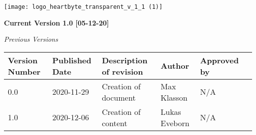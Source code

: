 \maketitle
\setlength{\parskip}{0em}

\begin{center}

      \vfill
\texttt{[image: logo\_heartbyte\_transparent\_v\_1\_1 (1)]}

    \vfill
\clearpage


    \textbf{\large Current Version 1.0 [05-12-20]}
    \vspace{10mm}
    
    \emph{\large Previous Versions}
    
\begin{center}
\begin{tabular}{ | m{5em} | m{5em}| m{10em} |m{5em}| m{5em} |m{5em} |  } 
\hline
Version Number& Published Date & Description of revision & Author & Approved by \\ 
\hline
0.0 & 2020-11-29 & Creation of document & Max Klasson & N/A \\
\hline
1.0 & 2020-12-06 & Creation of content & Lukas Eveborn & N/A \\
\hline

\end{tabular}
\end{center}

\end{center}

\clearpage
    {
 
        \renewcommand{\contentsname}{Innehåll}
        \tableofcontents
    }
    
\clearpage